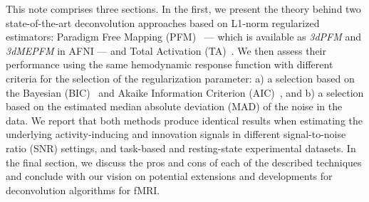 This note comprises three sections. In the first, we present the theory behind two state-of-the-art deconvolution approaches based on L1-norm regularized estimators: Paradigm Free Mapping (PFM)~\cite{caballerogaudes2013ParadigmFreeMapping} --- which is available as \textit{3dPFM} and \textit{3dMEPFM} in AFNI --- and Total Activation (TA)~\cite{karahanoglu2013TotalActivationFMRI}. We then assess their performance using the same hemodynamic response function with different criteria for the selection of the regularization parameter: a) a selection based on the Bayesian (BIC)~\cite{schwarz1978EstimatingDimensionModel} and Akaike Information Criterion (AIC)~\cite{akaike1998InformationTheoryExtension}, and b) a selection based on the estimated median absolute deviation (MAD) of the noise in the data. We report that both methods produce identical results when estimating the underlying activity-inducing and innovation signals in different signal-to-noise ratio (SNR) settings, and task-based and resting-state experimental datasets. In the final section, we discuss the pros and cons of each of the described techniques and conclude with our vision on potential extensions and developments for deconvolution algorithms for fMRI.